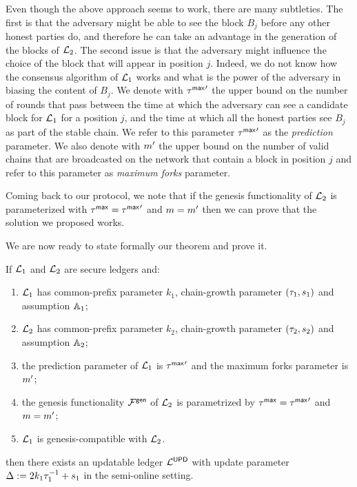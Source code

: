 Even though the above approach seems to work, there are many subtleties. The first is that the adversary might 
be able to see the block $B_j$ before any other honest parties do, and therefore he can take an advantage in the generation
of the blocks of $\mathcal{L}_2$. The second issue is that the adversary might influence the choice of the block
that will appear in position $j$. Indeed, we do not know how the consensus algorithm of $\mathcal{L}_1$ works and what is the power of the adversary in biasing the content of $B_j$. 
We denote with ${\tau^\mathsf{max}}'$ the upper bound on the number of rounds that pass between the time at which 
the adversary can see a candidate
block for $\mathcal{L}_1$ for a position $j$, and the time at which all the honest parties see $B_j$ as part of the stable chain. We refer to this parameter ${\tau^\mathsf{max}}'$ as the \emph{prediction} parameter. 
We also denote with ${m}'$ the upper bound on the number of valid chains that are broadcasted on the network that contain a block in position $j$ and refer to this parameter as \emph{maximum forks} parameter.

Coming back to our protocol, we note that if the genesis functionality of $\mathcal{L}_2$ is parameterized
with $\tau^\mathsf{max}={\tau^\mathsf{max}}'$ and $m={m}'$ then we can prove that the solution we proposed works.

We are now ready to state formally our theorem and prove it.

\begin{theorem}
If $\mathcal{L}_1$ and $\mathcal{L}_2$ are secure ledgers and:
\begin{enumerate}
	\item $\mathcal{L}_1$  has common-prefix parameter $k_1$, chain-growth parameter  $(\tau_1, s_1)$ and
	assumption $\mathbb{A}_1$;
	\item $\mathcal{L}_2$  has common-prefix parameter $k_2$, chain-growth parameter  $(\tau_2, s_2)$ and
	assumption $\mathbb{A}_2$;
	\item the prediction parameter of $\mathcal{L}_1$ is ${\tau^\mathsf{max}}'$ and the maximum forks parameter is ${m}'$;
	\item the genesis functionality $\mathcal{F}^\mathsf{gen}$ of $\mathcal{L}_2$ is parametrized by $\tau^\mathsf{max}={\tau^\mathsf{max}}'$ and 
	$m={m}'$;
	\item $\mathcal{L}_1$ is genesis-compatible with $\mathcal{L}_2$.
\end{enumerate}

then there exists an updatable ledger $\mathcal{L}^\mathsf{UPD}$ with update parameter $\Delta:=2k_1 \tau_1^{-1}+s_1$ in the
semi-online setting.

\end{theorem}





